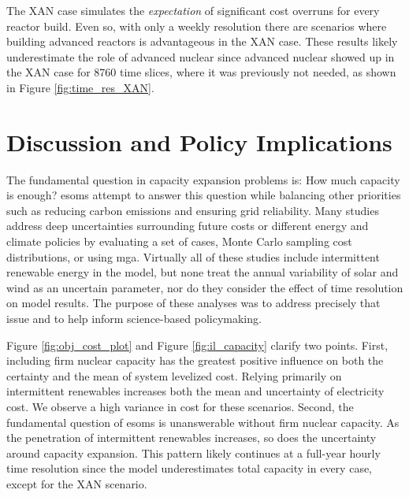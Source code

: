 The \gls{XAN} case simulates the
\textit{expectation} of significant cost overruns for every reactor build. Even so,
with only a weekly resolution there are scenarios where building advanced reactors
is advantageous in the \gls{XAN} case. These results likely underestimate the role of
advanced nuclear since advanced nuclear showed up in the \gls{XAN} case for 8760
time slices, where it was previously not needed, as shown in Figure \ref{fig:time_res_XAN}.

\section{Discussion and Policy Implications}

The fundamental question in capacity expansion problems is: How much capacity is enough?
\glspl{esom} attempt to answer this question while balancing other priorities such
as reducing carbon emissions and ensuring grid reliability. Many studies address
deep uncertainties surrounding future costs
\cite{alzbutas_uncertainty_2012,barron_differential_2015,komiyama_energy_2015,
li_open_2020,yue_least_2020} or different energy and climate policies \cite{bennett_extending_2021,
bouckaert_expanding_2014,de_sisternes_value_2016,decarolis_modelling_2016,neumann_near-optimal_2021,
seck_embedding_2020} by evaluating a set of cases, Monte Carlo sampling cost distributions,
or using \gls{mga}. Virtually all of these studies include intermittent renewable
energy in the model, but none treat the annual variability of solar and wind
as an uncertain parameter, nor do they consider the effect of time resolution on
model results. The purpose of these analyses was to address precisely that issue
and to help inform science-based policymaking.

Figure \ref{fig:obj_cost_plot} and Figure \ref{fig:il_capacity} clarify
two points. First, including firm nuclear capacity has the greatest positive
influence on both the certainty and the mean of system levelized cost. Relying primarily
on intermittent renewables increases both the mean and uncertainty of electricity cost.
We observe a high variance in cost for these scenarios.
Second, the fundamental question of \glspl{esom} is unanswerable without firm nuclear capacity.
As the penetration of intermittent renewables increases, so does the uncertainty around
capacity expansion. This pattern likely continues at a full-year hourly time resolution
since the model underestimates total capacity in every case, except for the \gls{XAN} scenario.

